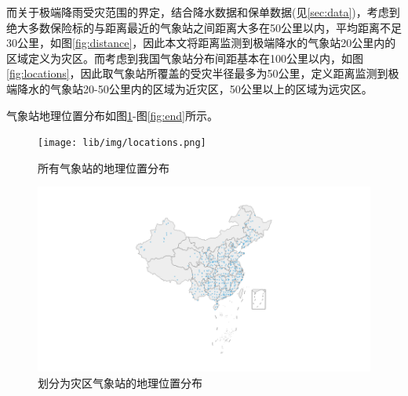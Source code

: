 而关于极端降雨受灾范围的界定，结合降水数据和保单数据(见\ref{sec:data})，考虑到绝大多数保险标的与距离最近的气象站之间距离大多在50公里以内，平均距离不足30公里，如图\ref{fig:distance}，因此本文将距离监测到极端降水的气象站20公里内的区域定义为灾区。而考虑到我国气象站分布间距基本在100公里以内，如图\ref{fig:locations}，因此取气象站所覆盖的受灾半径最多为50公里，定义距离监测到极端降水的气象站20-50公里内的区域为近灾区，50公里以上的区域为远灾区。

气象站地理位置分布如图\ref{fig:location}-图\ref{fig:end}所示。

\begin{figure}[H]
    \centering
    \begin{minipage}{0.48\linewidth}
        \texttt{[image: lib/img/locations.png]}
        \caption{所有气象站的地理位置分布}
        \label{fig:location}
    \end{minipage}
    \begin{minipage}{0.48\linewidth}
        \includegraphics[width=\textwidth, trim=200 0 200 0]{lib/img/near.png}
        \caption{划分为灾区气象站的地理位置分布}
    \end{minipage}
\end{figure}
